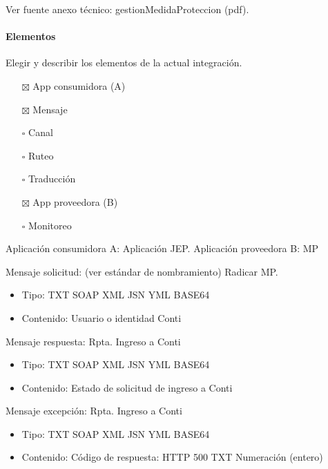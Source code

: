 \documentclass[
  paper=a4,
  ,captions=tableheading
]{scrartcl}
\providecommand{\tightlist}{%
  \setlength{\itemsep}{0pt}\setlength{\parskip}{0pt}}
\begin{document}
Ver fuente anexo técnico: gestionMedidaProteccion (pdf).

\paragraph{Elementos}\label{sec:elementos-1}

Elegir y describir los elementos de la actual integración.

\begin{itemize}
\tightlist
\item[$\boxtimes$]
  App consumidora (A)
\item[$\boxtimes$]
  Mensaje
\item[$\square$]
  Canal
\item[$\square$]
  Ruteo
\item[$\square$]
  Traducción
\item[$\boxtimes$]
  App proveedora (B)
\item[$\square$]
  Monitoreo
\end{itemize}

Aplicación consumidora A: Aplicación JEP. Aplicación proveedora B: MP

Mensaje solicitud: (ver estándar de nombramiento) Radicar MP.

\begin{itemize}
\tightlist
\item
  Tipo: TXT \textbar{} SOAP \textbar{} XML \textbar{} JSN \textbar{} YML
  \textbar{} BASE64
\item
  Contenido: Usuario o identidad Conti
\end{itemize}

Mensaje respuesta: Rpta. Ingreso a Conti

\begin{itemize}
\tightlist
\item
  Tipo: TXT \textbar{} SOAP \textbar{} XML \textbar{} JSN \textbar{} YML
  \textbar{} BASE64
\item
  Contenido: Estado de solicitud de ingreso a Conti
\end{itemize}

Mensaje excepción: Rpta. Ingreso a Conti

\begin{itemize}
\tightlist
\item
  Tipo: TXT \textbar{} SOAP \textbar{} XML \textbar{} JSN \textbar{} YML
  \textbar{} BASE64
\item
  Contenido: Código de respuesta: HTTP 500 \textbar{} TXT \textbar{}
  Numeración (entero)
\end{itemize}
\end{document}
